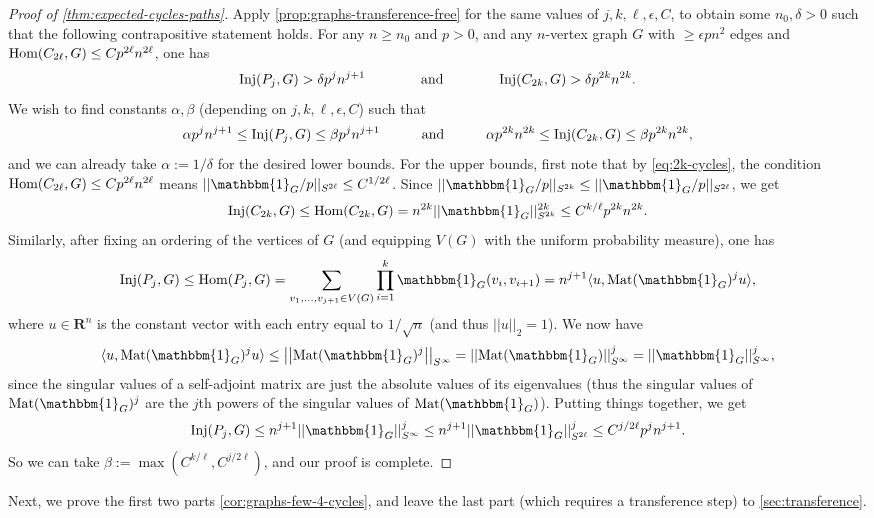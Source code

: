 \documentclass[reqno,11pt]{amsart}
\theoremstyle{definition}
\theoremstyle{remark}
\numberwithin{equation}{section}
\newcommand{\R}{\mathbf{R}}
\newcommand{\one}{\mathbbm{1}}
\newcommand{\Mat}{\textnormal{Mat}}
\newcommand{\Hom}{\textnormal{Hom}}
\newcommand{\Inj}{\textnormal{Inj}}
\begin{document}
\begin{proof}[Proof of \cref{thm:expected-cycles-paths}]
Apply \cref{prop:graphs-transference-free} for the same values of $j, k, \ell, \epsilon, C$, to obtain some $n_0, \delta > 0$ such that the following contrapositive statement holds. For any $n \ge n_0$ and $p > 0$, and any $n$-vertex graph $G$ with $\ge \epsilon p n^2$ edges and $\Hom(C_{2\ell}, G) \le C p^{2\ell} n^{2\ell}$, one has
\[
    \Inj(P_{j}, G) > \delta p^{j} n^{j+1}
    \qquad\qquad 
    \text{and} 
    \qquad\qquad 
    \Inj(C_{2k}, G) > \delta p^{2k} n^{2k}.
\]
We wish to find constants $\alpha, \beta$ (depending on $j, k, \ell, \epsilon, C$) such that
\[
    \alpha p^j n^{j+1} \le \Inj(P_{j}, G) \le \beta p^{j} n^{j+1}
    \qquad\quad \text{and} \qquad\quad 
    \alpha p^{2k} n^{2k} \le \Inj(C_{2k}, G) \le \beta p^{2k} n^{2k},
\]
and we can already take $\alpha := 1/\delta$ for the desired lower bounds. For the upper bounds, first note that by \cref{eq:2k-cycles}, the condition $\Hom(C_{2\ell}, G) \le Cp^{2\ell} n^{2\ell}$ means $||\one_{G}/p||_{S^{2\ell}} \le C^{1/{2\ell}}$. Since $||\one_{G}/p||_{S^{2k}} \le ||\one_{G}/p||_{S^{2\ell}}$, we get
\[
    \Inj(C_{2k}, G) \le \Hom(C_{2k}, G)
    =
    n^{2k} ||\one_{G}||_{S^{2k}}^{2k}
    \le 
    C^{k/\ell} p^{2k} n^{2k}.
\]
Similarly, after fixing an ordering of the vertices of $G$ (and equipping $V(G)$ with the uniform probability measure), one has
\[
    \Inj(P_{j},G) \le \Hom(P_{j}, G) = 
    \sum_{v_1, \ldots, v_{j+1} \in V(G)} \prod_{i=1}^k \one_{G}(v_i, v_{i+1})
    =
    n^{j+1} \langle u, \Mat(\one_{G})^{j} u \rangle,
\]
where $u \in \R^n$ is the constant vector with each entry equal to $1/\sqrt{n}$ (and thus $||u||_{2} = 1$). We now have
\[
    \langle u, \Mat(\one_{G})^{j} u\rangle
    \le 
    \left\vert \left\vert \Mat(\one_{G})^{j} \right\vert \right\vert_{S^\infty}
    =
    \left\vert \left\vert \Mat(\one_{G}) \right\vert \right\vert_{S^\infty}^{j} = 
    ||\one_{G}||_{S^\infty}^{j},
\]
since the singular values of a self-adjoint matrix are just the absolute values of its eigenvalues (thus the singular values of $\Mat(\one_G)^j$ are the $j$th powers of the singular values of $\Mat(\one_G)$). Putting things together, we get
\[
    \Inj(P_j,G) \le n^{j+1} ||\one_{G}||_{S^\infty}^{j}
    \le 
    n^{j+1}
    ||\one_{G}||_{S^{2\ell}}^{j}
    \le 
    C^{j/2\ell} p^{j} n^{j+1}.
\]
So we can take $\beta := \max(C^{k/\ell}, C^{j/2\ell})$, and our proof is complete.
\end{proof}

Next, we prove the first two parts \cref{cor:graphs-few-4-cycles}, and leave the last part (which requires a transference step) to \cref{sec:transference}.
\end{document}
